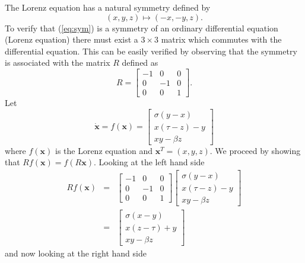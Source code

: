 \documentclass[12pt]{article}
\begin{document}
The Lorenz equation has a natural symmetry defined by 
\begin{equation}
(x,y,z) \mapsto (-x,-y,z). \label{eq:sym}
\end{equation}
To verify that (\ref{eq:sym}) is a symmetry of an ordinary differential equation (Lorenz equation) there must exist a $3\times3$ matrix which commutes with the differential equation.  This can be easily verified by observing that the symmetry is associated with the matrix $R$ defined as
\begin{equation}
R = \begin{bmatrix}
-1 & 0 & 0  \\
0 & -1 & 0 \\
0 & 0 & 1 
\end{bmatrix}.
\end{equation}
Let
\begin{equation}
\dot{\textbf{x}} = f(\textbf{x}) = \begin{bmatrix}
\sigma(y-x)  \\
x(\tau - z) -y \\
xy - \beta z
\end{bmatrix}
\end{equation}
where $f(\textbf{x})$ is the Lorenz equation and $\textbf{x}^T = (x,y,z)$.  We proceed by showing that $Rf(\textbf{x}) = f(R\textbf{x})$. Looking at the left hand side
\begin{eqnarray*}
Rf(\textbf{x}) & = & \begin{bmatrix}
-1 & 0 & 0  \\
0 & -1 & 0 \\
0 & 0 & 1 
\end{bmatrix} 
\begin{bmatrix}
\sigma(y-x)  \\
x(\tau - z) -y \\
xy - \beta z
\end{bmatrix}\\
& = & \begin{bmatrix}
\sigma(x-y)  \\
x(z - \tau ) + y \\
xy - \beta z
\end{bmatrix}
\end{eqnarray*}
and now looking at the right hand side
\end{document}

